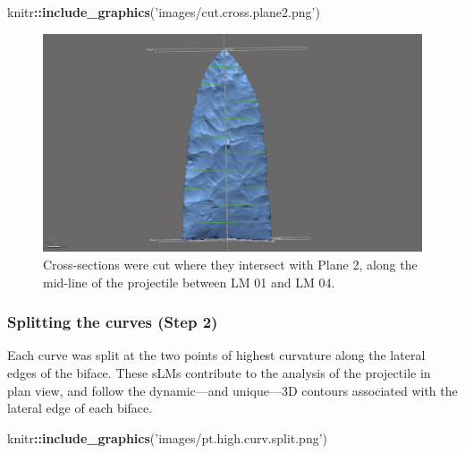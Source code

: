 \documentclass[
]{article}
\newenvironment{Shaded}{\begin{snugshade}}{\end{snugshade}}
\newcommand{\KeywordTok}[1]{\textcolor[rgb]{0.13,0.29,0.53}{\textbf{#1}}}
\newcommand{\NormalTok}[1]{#1}
\newcommand{\OperatorTok}[1]{\textcolor[rgb]{0.81,0.36,0.00}{\textbf{#1}}}
\newcommand{\StringTok}[1]{\textcolor[rgb]{0.31,0.60,0.02}{#1}}
\begin{document}
\begin{Shaded}
\begin{Highlighting}[]
\NormalTok{knitr}\OperatorTok{::}\KeywordTok{include_graphics}\NormalTok{(}\StringTok{'images/cut.cross.plane2.png'}\NormalTok{)}
\end{Highlighting}
\end{Shaded}

\begin{figure}
\includegraphics[width=1\linewidth]{images/cut.cross.plane2} \caption{Cross-sections were cut where they intersect with Plane 2, along the mid-line of the projectile between LM 01 and LM 04.}\label{fig:cut.cross.plane2}
\end{figure}

\hypertarget{splitting-the-curves-step-2}{%
\subsubsection{Splitting the curves (Step
2)}\label{splitting-the-curves-step-2}}

Each curve was split at the two points of highest curvature along the
lateral edges of the biface. These sLMs contribute to the analysis of
the projectile in plan view, and follow the dynamic---and unique---3D
contours associated with the lateral edge of each biface.

\begin{Shaded}
\begin{Highlighting}[]
\NormalTok{knitr}\OperatorTok{::}\KeywordTok{include_graphics}\NormalTok{(}\StringTok{'images/pt.high.curv.split.png'}\NormalTok{)}
\end{Highlighting}
\end{Shaded}
\end{document}

